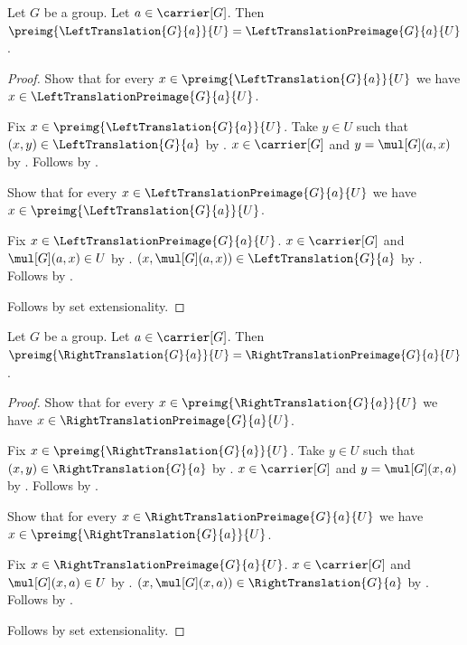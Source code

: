 \begin{lemma}\label{left_translation_set_preimage}
    Let $G$ be a group.
    Let $a\in\carrier[G]$.
    Then $\preimg{\LeftTranslation{G}{a}}{U}
        =\LeftTranslationPreimage{G}{a}{U}$.
\end{lemma}
\begin{proof}
    Show that for every $x\in\preimg{\LeftTranslation{G}{a}}{U}$ we have
        $x\in\LeftTranslationPreimage{G}{a}{U}$.
    \begin{subproof}
        Fix $x\in\preimg{\LeftTranslation{G}{a}}{U}$.
        Take $y\in U$ such that $(x,y)\in\LeftTranslation{G}{a}$
            by .
        $x\in\carrier[G]$ and $y=\mul[G](a,x)$
            by .
        Follows by .
    \end{subproof}
    Show that for every $x\in\LeftTranslationPreimage{G}{a}{U}$ we have
        $x\in\preimg{\LeftTranslation{G}{a}}{U}$.
    \begin{subproof}
        Fix $x\in\LeftTranslationPreimage{G}{a}{U}$.
        $x\in\carrier[G]$ and $\mul[G](a,x)\in U$
            by .
        $(x,\mul[G](a,x))\in\LeftTranslation{G}{a}$
            by .
        Follows by .
    \end{subproof}
    Follows by set extensionality.
\end{proof}

\begin{lemma}\label{right_translation_set_preimage}
    Let $G$ be a group.
    Let $a\in\carrier[G]$.
    Then $\preimg{\RightTranslation{G}{a}}{U}
        =\RightTranslationPreimage{G}{a}{U}$.
\end{lemma}
\begin{proof}
    Show that for every $x\in\preimg{\RightTranslation{G}{a}}{U}$ we have
        $x\in\RightTranslationPreimage{G}{a}{U}$.
    \begin{subproof}
        Fix $x\in\preimg{\RightTranslation{G}{a}}{U}$.
        Take $y\in U$ such that $(x,y)\in\RightTranslation{G}{a}$
            by .
        $x\in\carrier[G]$ and $y=\mul[G](x,a)$
            by .
        Follows by .
    \end{subproof}
    Show that for every $x\in\RightTranslationPreimage{G}{a}{U}$ we have
        $x\in\preimg{\RightTranslation{G}{a}}{U}$.
    \begin{subproof}
        Fix $x\in\RightTranslationPreimage{G}{a}{U}$.
        $x\in\carrier[G]$ and $\mul[G](x,a)\in U$
            by .
        $(x,\mul[G](x,a))\in\RightTranslation{G}{a}$
            by .
        Follows by .
    \end{subproof}
    Follows by set extensionality.
\end{proof}

